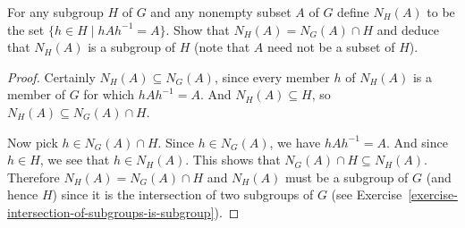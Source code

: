  For any subgroup $H$ of $G$ and any nonempty subset $A$ of
$G$ define $N_H(A)$ to be the set $\{h\in H \mid hAh^{-1} = A\}$. Show
that $N_H(A) = N_G(A)\cap H$ and deduce that $N_H(A)$ is a subgroup of
$H$ (note that $A$ need not be a subset of $H$).
\begin{proof}
  Certainly $N_H(A)\subseteq N_G(A)$, since every member $h$ of
  $N_H(A)$ is a member of $G$ for which $hAh^{-1} = A$. And
  $N_H(A)\subseteq H$, so $N_H(A)\subseteq N_G(A)\cap H$.

  Now pick $h\in N_G(A)\cap H$. Since $h\in N_G(A)$, we have
  $hAh^{-1} = A$. And since $h\in H$, we see that $h\in N_H(A)$. This
  shows that $N_G(A)\cap H\subseteq N_H(A)$. Therefore
  $N_H(A) = N_G(A)\cap H$ and $N_H(A)$ must be a subgroup of $G$ (and
  hence $H$) since it is the intersection of two subgroups of $G$ (see
  Exercise~\ref{exercise-intersection-of-subgroups-is-subgroup}).
\end{proof}
